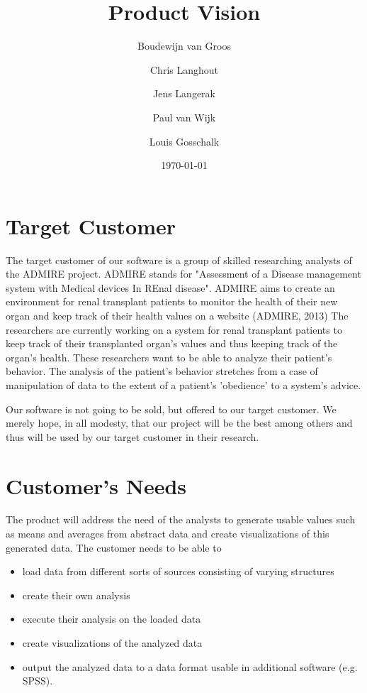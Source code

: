 \documentclass[a4paper]{article}
\title{Product Vision}
\author[1]{Boudewijn van Groos}
\author[2]{Chris Langhout}
\author[3]{Jens Langerak}
\author[4]{Paul van Wijk}
\author[5]{Louis Gosschalk}
\affil[1]{bvangroos \\
4229843}
\affil[2]{clanghout \\
4281705}
\affil[3]{jlangerak \\
4317327}
\affil[4]{pvanwijk \\
4285034}
\affil[5]{lgosschalk \\
4214528}
\date{\today}
\begin{document}
\maketitle
\tableofcontents
\newpage

\section{Target Customer}
The target customer of our software is a group of skilled researching analysts of the ADMIRE project. ADMIRE stands for "Assessment of a Disease management system with Medical devices In REnal disease". ADMIRE aims to create an environment for renal transplant patients to monitor the health of their new organ and keep track of their health values on a website (ADMIRE, 2013)
The researchers are currently working on a system for renal transplant patients to keep track of their transplanted organ's values and thus keeping track of the organ's health. These researchers want to be able to analyze their patient's behavior. The analysis of the patient's behavior stretches from a case of manipulation of data to the extent of a patient's 'obedience' to a system's advice. 
\par
Our software is not going to be sold, but offered to our target customer. We merely hope, in all modesty, that our project will be the best among others and thus will be used by our target customer in their research.

\section{Customer's Needs}
The product will address the need of the analysts to generate usable values such as means and averages from abstract data and create visualizations of this generated data. The customer needs to be able to 
\begin{itemize}
\item load data from different sorts of sources consisting of varying structures 
\item create their own analysis 
\item execute their analysis on the loaded data
\item create visualizations of the analyzed data
\item output the analyzed data to a data format usable in additional software (e.g. SPSS).
\end{itemize}
\end{document}
